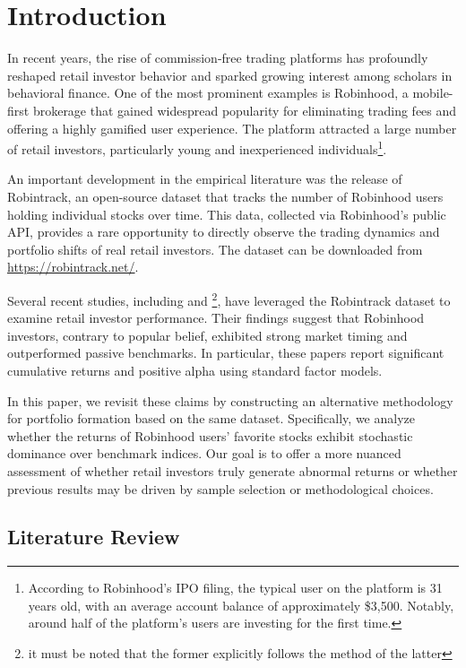 \section{Introduction}

In recent years, the rise of commission-free trading platforms has profoundly reshaped retail investor behavior and sparked growing interest among scholars in behavioral finance. 
One of the most prominent examples is Robinhood, a mobile-first brokerage that gained widespread popularity for eliminating trading fees and offering a highly gamified user experience. 
The platform attracted a large number of retail investors, particularly young and inexperienced individuals\footnote{
According to Robinhood's IPO filing, the typical user on the platform is 31 years old, with an average account balance of approximately \$3,500. 
Notably, around half of the platform's users are investing for the first time.}.

An important development in the empirical literature was the release of Robintrack, an open-source dataset that tracks the number of Robinhood users holding individual stocks over time. 
This data, collected via Robinhood's public API, provides a rare opportunity to directly observe the trading dynamics and portfolio shifts of real retail investors. 
The dataset can be downloaded from \url{https://robintrack.net/}.

Several recent studies, including \cite{Fedyk2024} and \cite{Welch2022}\footnote{it must be noted that the former explicitly follows the method of the latter}, 
have leveraged the Robintrack dataset to examine retail investor performance. 
Their findings suggest that Robinhood investors, contrary to popular belief, exhibited strong market timing and outperformed passive benchmarks. 
In particular, these papers report significant cumulative returns and positive alpha using standard factor models.

In this paper, we revisit these claims by constructing an alternative methodology for portfolio formation based on the same dataset. 
Specifically, we analyze whether the returns of Robinhood users' favorite stocks exhibit stochastic dominance over benchmark indices.
Our goal is to offer a more nuanced assessment of whether retail investors truly generate abnormal returns or whether previous results may be driven by sample selection or methodological choices.

\subsection{Literature Review}

